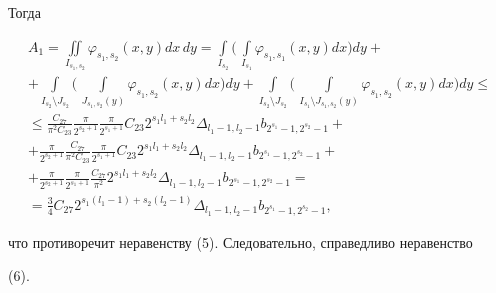 Тогда 


\begin{gather*} 


A_1=\iint\limits_{I_{s_1,s_2}}\varphi_{s_1,s_2}(x,y)dx\,dy= 


\int\limits_{I_{s_2}}\biggl(\,\int\limits_{I_{s_1}}\varphi_{s_1,s_1}(x,y)dx


\biggr) 


dy+ \\ 


% 


+\int\limits_{I_{s_2}\setminus J_{s_2}}\biggl(\, 


\int\limits_{J_{s_1,s_2}(y)}\varphi_{s_1,s_2}(x,y)dx\biggr)dy+ 


\int\limits_{I_{s_2}\setminus J_{s_2}}\biggl(\, 


\int\limits_{I_{s_1}\setminus J_{s_1,s_2}(y)}\varphi_{s_1,s_2}(x,y)dx 


\biggr)dy \le \\ 


% 


\le\frac{C_{27}}{\pi^2C_{23}}\frac{\pi}{2^{s_2+1}} 


\frac{\pi}{2^{s_1+1}}C_{23}2^{s_1l_1+s_2l_2} 


\Delta_{l_1-1,l_2-1}b_{2^{s_1}-1,2^{s_2}-1}+ \\ 


% 


+ \frac{\pi}{2^{s_2+1}}\frac{C_{27}}{\pi^2C_{23}} 


\frac{\pi}{2^{s_1+1}}C_{23}2^{s_1l_1+s_2l_2} 


\Delta_{l_1-1,l_2-1}b_{2^{s_1}-1,2^{s_2}-1}+ \\ 


% 


+ \frac{\pi}{2^{s_2+1}}\frac{\pi}{2^{s_1+1}} 


\frac{C_{27}}{\pi^2}2^{s_1l_1+s_2l_2} 


\Delta_{l_1-1,l_2-1}b_{2^{s_1}-1,2^{s_2}-1}= \\ 


% 


=\frac{3}{4}C_{27}2^{s_1(l_1-1)+s_2(l_2-1)}


\Delta_{l_1-1,l_2-1}b_{2^{s_1}-1,2^{s_2}-1},


\end{gather*} 


что противоречит неравенству (5). Следовательно, справедливо неравенство 


(6). 


